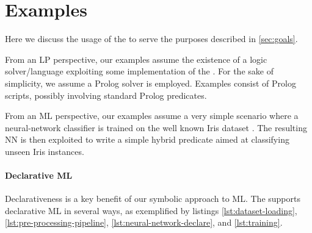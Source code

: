 \documentclass[
]{ceurart}
\begin{document}
\section{\mllib{} Examples}
\label{sec:examples}

Here we discuss the usage of the \mllib{} to serve the purposes described in \cref{sec:goals}.

From an LP perspective, our examples assume the existence of a logic solver/language exploiting some implementation of the \mllib{}.
%
For the sake of simplicity, we assume a Prolog solver is employed.
%
Examples consist of Prolog scripts, possibly involving standard Prolog predicates.

From an ML perspective, our examples assume a very simple scenario where a neural-network classifier is trained on the well known Iris dataset \cite{iris-dataset}.
%
The resulting NN is then exploited to write a simple hybrid predicate aimed at classifying unseen Iris instances.

\paragraph{Declarative ML}
%
Declarativeness is a key benefit of our symbolic approach to ML.
%
The \mllib{} supports declarative ML in several ways, as exemplified by listings \ref{lst:dataset-loading}, \ref{lst:pre-processing-pipeline}, \ref{lst:neural-network-declare}, and \ref{lst:training}.

\end{document}
